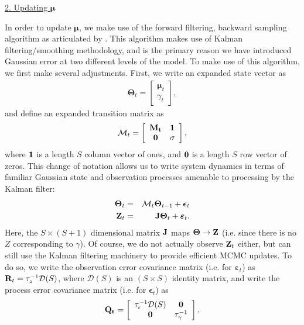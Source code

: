 \documentclass[12pt,fleqn]{article}
\begin{document}
\begin{flushleft}
\underline{2. Updating $\boldsymbol{\mu}$}

In order to update $\boldsymbol{\mu}$, we make use of the forward filtering, backward sampling algorithm \citep{CarterKohn1994,Fruhwirth1994} as articulated by \citep[][Section 8.3.2]{CressieWikle2011}.  This algorithm
makes use of Kalman filtering/smoothing methodology, and is the primary reason we have introduced Gaussian error
at two different levels of the model.  To make use of this algorithm, we first make several adjustments.  First, we write an expanded state vector as
\begin{eqnarray*}
  \boldsymbol{\Theta}_t = \left[  \begin{array}{c} \boldsymbol{\mu}_t \\ \gamma_t \end{array} \right],
\end{eqnarray*}
and define an expanded transition matrix as
\begin{eqnarray*}
  \mathcal{M}_t = \left[  \begin{array}{cc} \bf{M}_t & {\bf 1} \\ {\bf 0} & \sigma \end{array} \right],
\end{eqnarray*}
where ${\bf 1}$ is a length $S$ column vector of ones, and ${\bf 0}$ is a length $S$ row vector of zeros.  This change of notation allows us to write system dynamics in terms of familiar Gaussian state and observation processes amenable to processing by the Kalman filter:
\begin{eqnarray*}
  \boldsymbol{\Theta}_t & = & \mathcal{M}_t \boldsymbol{\Theta}_{t-1} + \boldsymbol{\epsilon}_t \\
  {\bf Z}_t & = & {\bf J} \boldsymbol{\Theta}_t + \boldsymbol{\varepsilon}_t.
\end{eqnarray*}
Here, the $S \times (S+1)$ dimensional matrix ${\bf J}$ maps $\boldsymbol{\Theta} \rightarrow {\bf Z}$ (i.e. since there is no $Z$ corresponding to $\gamma$).
Of course, we do not actually observe ${\bf Z}_t$ either, but can still use the Kalman filtering machinery to provide efficient MCMC updates.  To do so, we write the observation error covariance matrix (i.e. for $\boldsymbol{\varepsilon}_t$) as ${\bf R}_t = \tau_z^{-1} \mathcal{D}(S)$, where $\mathcal{D}(S)$ is an $(S \times S)$ identity matrix, and write the process error covariance matrix (i.e. for $\boldsymbol{\epsilon}_t$) as
\begin{eqnarray*}
  \bf{Q}_t = \left[  \begin{array}{cc} \tau_\epsilon^{-1} \mathcal{D}(S) & {\bf 0} \\ {\bf 0} & \tau_\gamma^{-1} \end{array} \right],

\end{eqnarray*}
\end{flushleft}
\end{document}

